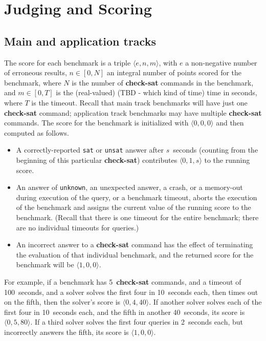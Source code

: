 \documentclass[12pt]{article}
\newcommand{\akey}[1]{\textbf{#1}}
\begin{document}
\section{Judging and Scoring}
\label{sec:judging}

\subsection{Main and application tracks}
The score for each benchmark is a triple $\langle e,n,m\rangle$, with
$e$ a non-negative number of erroneous results,
$n\in[0,N]$ an integral number of points scored for the benchmark,
where $N$ is the number of \akey{check-sat} commands
in the benchmark, and $m\in[0,T]$ is the (real-valued) (TBD - which kind of time) time in seconds, where $T$ is
the timeout.  Recall that main track benchmarks will have just one \akey{check-sat} command;
application track benchmarks may have multiple \akey{check-sat} commands.
The score for the benchmark is initialized with
$\langle0,0,0\rangle$ and then computed as follows.
\begin{itemize}
\item A correctly-reported \texttt{sat} or \texttt{unsat} answer after
  $s$~seconds (counting from the beginning of this particular
  \akey{check-sat}) contributes $\langle0,1,s\rangle$ to the running
  score.
\item An answer of \texttt{unknown}, an unexpected answer, a crash, or a memory-out during
  execution of the query, or a benchmark timeout, aborts the execution
  of the benchmark and assigns the current value of the running score
  to the benchmark.  (Recall that there is one timeout for the entire
  benchmark; there are no individual timeouts for queries.)
\item An incorrect answer to a \akey{check-sat} command has the effect of terminating the
  evaluation of that individual benchmark, and the returned score for the benchmark
  will be $\langle1,0,0\rangle$.
\end{itemize}


For example, if a benchmark has 5~\akey{check-sat} commands, and a
timeout of 100~seconds, and a solver solves the first four in
10~seconds each, then times out on the fifth, then the solver's score
is $\langle0,4,40\rangle$.  If another solver solves each of the first
four in 10~seconds each, and the fifth in another 40~seconds, its
score is $\langle0,5,80\rangle$.  If a third solver solves the first
four queries in 2~seconds each, but incorrectly answers the fifth, its
score is $\langle1,0,0\rangle$.
\end{document}

